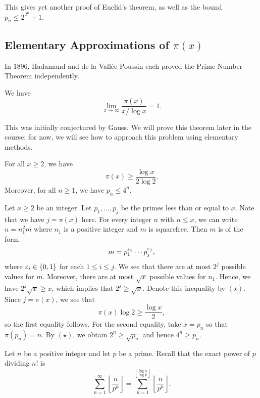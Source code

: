 This gives yet another proof of Euclid's theorem, as well as the bound $p_n \leq 2^{2^n} + 1$. 

\subsection{Elementary Approximations of $\pi(x)$}\label{subsec:1.2}
In 1896, Hadamand and de la Vall\'ee Poussin each proved the Prime Number Theorem independently. 

\begin{thm}\label{thm:1.11}
We have 
\[ \lim_{x\to\infty} \frac{\pi(x)}{x/\log x} = 1. \]
\end{thm}

This was initially conjectured by Gauss. We will prove this theorem later in the course; 
for now, we will see how to approach this problem using elementary methods. 

\begin{thm}\label{thm:1.12}
For all $x \geq 2$, we have 
\[ \pi(x) \geq \frac{\log x}{2\log 2}. \]
Moreover, for all $n \geq 1$, we have $p_n \leq 4^n$.
\end{thm}
\begin{pf}
Let $x \geq 2$ be an integer. Let $p_1, \dots, p_j$ be the primes less than or equal to $x$. 
Note that we have $j = \pi(x)$ here. For every integer $n$ with $n \leq x$, we can write $n = n_1^2m$
where $n_1$ is a positive integer and $m$ is squarefree. Then $m$ is of the form 
\[ m = p_1^{\varepsilon_1} \cdots p_j^{\varepsilon_j}, \]
where $\varepsilon_i \in \{0, 1\}$ for each $1 \leq i \leq j$. We see that there are at most $2^j$ possible 
values for $m$. Moreover, there are at most $\sqrt{x}$ possible values for $n_1$. Hence, we have 
$2^j \sqrt{x} \geq x$, which implies that $2^j \geq \sqrt{x}$. Denote this inequality by $(\star)$. 
Since $j = \pi(x)$, we see that 
\[ \pi(x) \log 2 \geq \frac{\log x}2, \]
so the first equality follows. For the second equality, take $x = p_n$ so that $\pi(p_n) = n$. 
By $(\star)$, we obtain $2^n \geq \sqrt{p_n}$ and hence $4^n \geq p_n$. 
\end{pf}

Let $n$ be a positive integer and let $p$ be a prime. Recall that the exact power of $p$ 
dividing $n!$ is 
\[ \sum_{n=1}^\infty \left\lfloor \frac{n}{p^k} \right\rfloor = \sum_{n=1}^{\left\lfloor \frac{\log n}{\log p} \right\rfloor} \left\lfloor \frac{n}{p^k} \right\rfloor. \]

